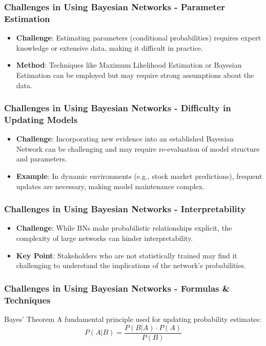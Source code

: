 \documentclass[aspectratio=169]{beamer}
\begin{document}
\begin{frame}[fragile]
    \frametitle{Challenges in Using Bayesian Networks - Parameter Estimation}
    \begin{itemize}
        \item \textbf{Challenge}: Estimating parameters (conditional probabilities) requires expert knowledge or extensive data, making it difficult in practice.
        \item \textbf{Method}: Techniques like Maximum Likelihood Estimation or Bayesian Estimation can be employed but may require strong assumptions about the data.
    \end{itemize}
\end{frame}

\begin{frame}[fragile]
    \frametitle{Challenges in Using Bayesian Networks - Difficulty in Updating Models}
    \begin{itemize}
        \item \textbf{Challenge}: Incorporating new evidence into an established Bayesian Network can be challenging and may require re-evaluation of model structure and parameters.
        \item \textbf{Example}: In dynamic environments (e.g., stock market predictions), frequent updates are necessary, making model maintenance complex.
    \end{itemize}
\end{frame}

\begin{frame}[fragile]
    \frametitle{Challenges in Using Bayesian Networks - Interpretability}
    \begin{itemize}
        \item \textbf{Challenge}: While BNs make probabilistic relationships explicit, the complexity of large networks can hinder interpretability.
        \item \textbf{Key Point}: Stakeholders who are not statistically trained may find it challenging to understand the implications of the network’s probabilities.
    \end{itemize}
\end{frame}

\begin{frame}[fragile]
    \frametitle{Challenges in Using Bayesian Networks - Formulas \& Techniques}
    \begin{block}{Bayes' Theorem}
        A fundamental principle used for updating probability estimates:
        \begin{equation}
            P(A|B) = \frac{P(B|A) \cdot P(A)}{P(B)}
        \end{equation}
    \end{block}
\end{frame}
\end{document}
